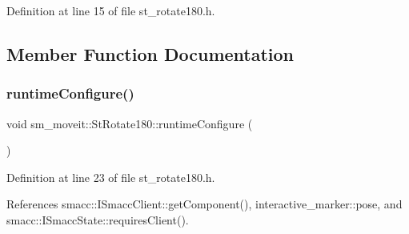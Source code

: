 Definition at line 15 of file st\+\_\+rotate180.\+h.



\subsection{Member Function Documentation}
\mbox{\label{structsm__moveit_1_1StRotate180_af424dc219c107d5c3678c6fc915d9c68}} 
\subsubsection{\texorpdfstring{runtime\+Configure()}{runtimeConfigure()}}
{\footnotesize\ttfamily void sm\+\_\+moveit\+::\+St\+Rotate180\+::runtime\+Configure (\begin{DoxyParamCaption}{ }\end{DoxyParamCaption})\hspace{0.3cm}{\ttfamily [inline]}}



Definition at line 23 of file st\+\_\+rotate180.\+h.



References smacc\+::\+I\+Smacc\+Client\+::get\+Component(), interactive\+\_\+marker\+::pose, and smacc\+::\+I\+Smacc\+State\+::requires\+Client().


